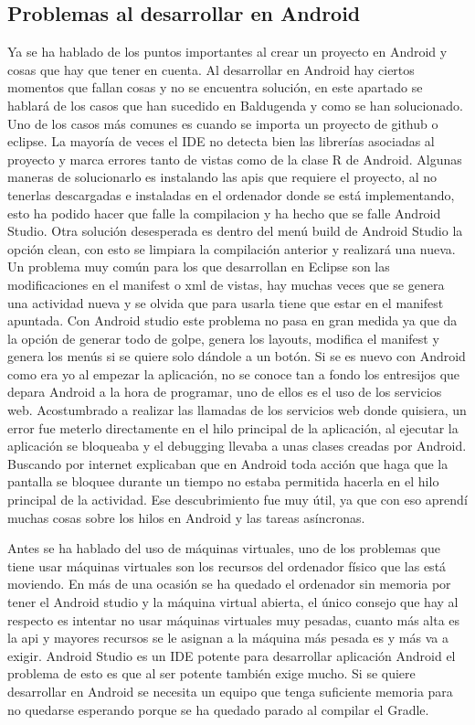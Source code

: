 \subsection{Problemas al desarrollar en Android}
\label{subsecc:Problemas al desarrollar en Android}

Ya se ha hablado de los puntos importantes al crear un proyecto en Android y cosas que hay que tener en cuenta.
Al desarrollar en Android hay ciertos momentos que fallan cosas y no se encuentra solución, en este apartado se hablará de los casos que han sucedido en Baldugenda y como se han solucionado.
Uno de los casos más comunes es cuando se importa un proyecto de github o eclipse. La mayoría de veces el IDE no detecta bien las librerías asociadas al proyecto y marca errores tanto de vistas como de la clase R de Android.
Algunas maneras de solucionarlo es instalando las apis que requiere el proyecto, al no tenerlas descargadas e instaladas en el ordenador donde se está implementando, esto ha podido hacer que falle la compilacion y ha hecho que se falle Android Studio.
Otra solución desesperada es dentro del menú build de Android Studio la opción clean, con esto se limpiara la compilación anterior y realizará una nueva.
Un problema muy común para los que desarrollan en Eclipse son las modificaciones en el manifest o xml de vistas, hay muchas veces que se genera una actividad nueva y se olvida que para usarla tiene que estar en el manifest apuntada.
Con Android studio este problema no pasa en gran medida ya que da la opción de generar todo de golpe, genera los layouts, modifica el manifest y genera los menús si se quiere solo dándole a un botón.
Si se es nuevo con Android como era yo al empezar la aplicación, no se conoce tan a fondo los entresijos  que depara Android a la hora de programar, uno de ellos es el uso de los servicios web.
Acostumbrado a realizar las llamadas de los servicios web donde quisiera, un error fue meterlo directamente en el hilo principal de la aplicación, al ejecutar la aplicación se bloqueaba y el debugging llevaba a unas clases creadas por Android.
Buscando por internet explicaban que en Android toda acción que haga que la pantalla se bloquee durante un tiempo no estaba permitida hacerla en el hilo principal de la actividad.
Ese descubrimiento fue muy útil, ya que con eso aprendí  muchas cosas sobre los hilos en Android y las tareas asíncronas.

 
Antes se ha hablado del uso de máquinas virtuales, uno de los problemas que tiene usar máquinas virtuales son los recursos del ordenador físico que las está moviendo. En más de una ocasión se ha quedado el ordenador sin memoria por tener el Android studio y la máquina virtual abierta, el único consejo que hay al respecto es intentar no usar máquinas virtuales muy pesadas, cuanto más alta es la api y mayores recursos se le asignan a la máquina más pesada es y más va a exigir.
Android Studio es un IDE potente para desarrollar aplicación Android el problema de esto es que al ser potente también exige mucho. Si se quiere desarrollar en Android se necesita un equipo que tenga suficiente memoria para no quedarse esperando porque se ha quedado parado al compilar el Gradle.

